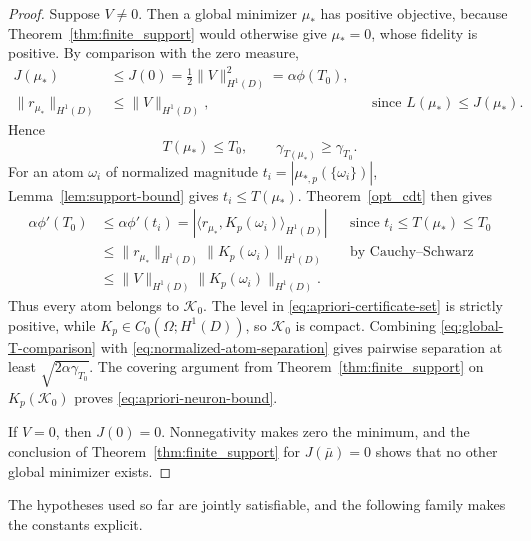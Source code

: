 \documentclass[11pt]{amsart}
\theoremstyle{definition}
\theoremstyle{remark}
\begin{document}
\begin{proof}
Suppose $V\neq0$.  Then a global minimizer $\mu_*$ has positive objective,
because Theorem~\ref{thm:finite_support} would otherwise give
$\mu_*=0$, whose fidelity is positive.  By comparison with the zero measure,
\begin{align*}
	J(\mu_*)
	&\leq J(0)=\frac12\|V\|_{H^1(D)}^2
	=\alpha\phi(T_0),\\
	\|r_{\mu_*}\|_{H^1(D)}
	&\leq\|V\|_{H^1(D)},
	&&\text{since $L(\mu_*)\leq J(\mu_*)$}.
\end{align*}
Hence
\begin{equation}
\label{eq:global-T-comparison}
	T(\mu_*)\leq T_0,
	\qquad
	\gamma_{T(\mu_*)}\geq\gamma_{T_0}.
\end{equation}
For an atom $\omega_i$ of normalized magnitude
$t_i=|\mu_{*,p}(\{\omega_i\})|$, Lemma~\ref{lem:support-bound} gives
$t_i\leq T(\mu_*)$. Theorem~\ref{opt_cdt} then gives
\begin{align*}
	\alpha\phi'(T_0)
	&\leq\alpha\phi'(t_i)
	=|\langle r_{\mu_*},K_p(\omega_i)\rangle_{H^1(D)}|
	&&\text{since $t_i\leq T(\mu_*)\leq T_0$}\\
	&\leq\|r_{\mu_*}\|_{H^1(D)}
	\|K_p(\omega_i)\|_{H^1(D)}
	&&\text{by Cauchy--Schwarz}\\
	&\leq\|V\|_{H^1(D)}
	\|K_p(\omega_i)\|_{H^1(D)}.
\end{align*}
Thus every atom belongs to $\mathcal K_0$.  The level in
\eqref{eq:apriori-certificate-set} is strictly positive, while
$K_p\in C_0(\Omega;H^1(D))$, so $\mathcal K_0$ is compact.  Combining
\eqref{eq:global-T-comparison} with
\eqref{eq:normalized-atom-separation} gives pairwise separation at least
$\sqrt{2\alpha\gamma_{T_0}}$.  The covering argument from
Theorem~\ref{thm:finite_support} on $K_p(\mathcal K_0)$ proves
\eqref{eq:apriori-neuron-bound}.

If $V=0$, then $J(0)=0$.  Nonnegativity makes zero the minimum, and the
conclusion of Theorem~\ref{thm:finite_support} for $J(\bar\mu)=0$ shows that no
other global minimizer exists.
\end{proof}

The hypotheses used so far are jointly satisfiable, and the following family
makes the constants explicit.
\end{document}
